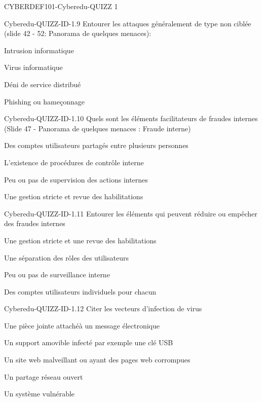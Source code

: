 \documentclass[12pt]{article}
\begin{document}
\begin{quiz}{CYBERDEF101-Cyberedu-QUIZZ 1}
\begin{multi}[multiple=true]{Cyberedu-QUIZZ-ID-1.9}
	Entourer les attaques g\'en\'eralement de type non  cibl\'ee  (slide 42 - 52: Panorama de quelques menaces):
\item 	Intrusion informatique
\item* 	Virus informatique
\item 	D\'eni de service distribu\'e
\item* 	Phishing ou hame\c{c}onnage
\end{multi}

\begin{multi}[multiple=true]{Cyberedu-QUIZZ-ID-1.10}
	Quels sont les \'el\'ements facilitateurs de fraudes internes (Slide 47 - Panorama de quelques menaces : Fraude interne)
\item* 	Des comptes utilisateurs partag\'es entre plusieurs personnes
\item 	L'existence de proc\'edures de contr\^ole interne
\item* 	Peu ou pas de supervision des actions internes
\item 	Une gestion stricte et revue des habilitations
\end{multi}

\begin{multi}[multiple=true]{Cyberedu-QUIZZ-ID-1.11}
	Entourer les \'el\'ements qui peuvent r\'eduire ou emp\^echer des fraudes internes
\item* 	Une gestion stricte et une revue des habilitations
\item* 	Une s\'eparation des rôles des utilisateurs
\item 	Peu ou pas de surveillance interne
\item* 	Des comptes utilisateurs individuels pour chacun
\end{multi}

\begin{multi}[multiple=true]{Cyberedu-QUIZZ-ID-1.12}
	Citer les vecteurs d'infection de virus 
\item* 	Une pi\`ece jointe attach\'e\`a un message \'electronique
\item* 	Un support amovible infect\'e par exemple une cl\'e USB
\item* 	Un site web malveillant ou ayant des pages web corrompues
\item* 	Un partage r\'eseau ouvert
\item* 	Un syst\`eme vuln\'erable
\end{multi}


\end{quiz}
\end{document}
